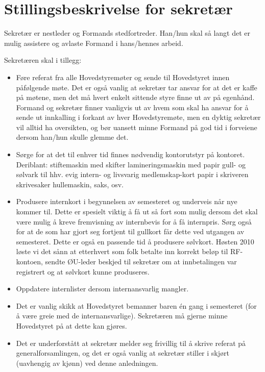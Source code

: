 \section{Stillingsbeskrivelse for sekretær}

Sekretær er nestleder og Formands stedfortreder.
Han/hun skal så langt det er mulig assistere og
avlaste Formand i hans/hennes arbeid.

Sekretæren skal i tillegg:
\begin{itemize}
\item Føre referat fra alle Hovedstyremøter og
      sende til Hovedstyret innen påfølgende møte. 
	\subitem Det er også vanlig at sekretær tar ansvar for at det er kaffe på møtene, men det må hvert enkelt sittende styre finne ut av på egenhånd.
	\subitem Formand og sekretær finner vanligvis ut av hvem som skal ha ansvar for å sende ut innkalling i forkant av hver Hovedstyremøte, men en dyktig sekretær vil alltid ha oversikten, og bør uansett minne Formand på god tid i forveiene dersom han/hun skulle glemme det. 
\item Sørge for at det til enhver tid finnes nødvendig kontorutstyr på kontoret. Deriblant:
	\subitem stiftemaskin med skifter
	\subitem lamineringsmaskin med papir
	\subitem gull- og sølvark til hhv. evig intern- og livsvarig medlemskap-kort
	\subitem papir i skriveren
	\subitem skrivesaker
	\subitem hullemaskin, saks, osv. 
\item Produsere internkort i begynnelsen av semesteret og underveis når nye kommer til. Dette er spesielt viktig å få ut så fort som mulig dersom det 
skal være mulig å kreve fremvisning av internbevis for å få internpris.
	\subitem Sørg også for at de som har gjort seg fortjent til gullkort får dette ved utgangen av semesteret. Dette er også en passende tid å produsere sølvkort. Høsten 2010 løste vi det sånn at etterhvert som folk betalte inn korrekt beløp til RF-kontoen, sendte ØU-leder beskjed til sekretær om at innbetalingen var registrert og at sølvkort kunne produseres. 
\item Oppdatere internlister dersom internansvarlig mangler.
\item Det er vanlig skikk at Hovedstyret bemanner baren én gang i semesteret (for å være greie med de internansvarlige). Sekretæren må gjerne minne Hovedstyret på at dette kan gjøres.
\item Det er underforstått at sekretær melder seg frivillig til å skrive referat på generalforsamlingen, og det er også vanlig at sekretær stiller i skjørt (uavhengig av kjønn) ved denne anledningen.

\end{itemize}
